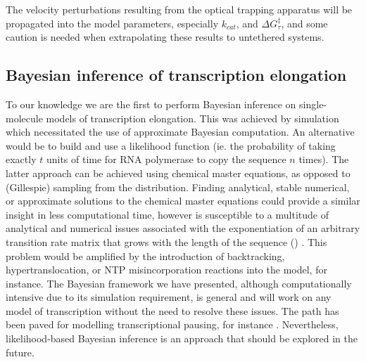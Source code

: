 \documentclass[10pt,letterpaper]{article}
\begin{document}
The velocity perturbations resulting from the optical trapping apparatus will be propagated into the model parameters, especially $k_{cat}$, and $\Delta G^\ddag_\tau$, and some caution is needed when extrapolating these results to untethered systems.   





\subsection*{Bayesian inference of transcription elongation} To our knowledge we are the first to perform Bayesian inference on single-molecule models of transcription elongation. This was achieved by simulation which necessitated the use of approximate Bayesian computation. An alternative would be to build and use a likelihood function (ie. the probability of taking exactly $t$ units of time for RNA polymerase to copy the sequence $n$ times). The latter approach can be achieved using chemical master equations, as opposed to (Gillespie) sampling from the distribution. Finding analytical, stable numerical, or approximate solutions to the chemical master equations could provide a similar insight in less computational time, however is susceptible to a multitude of analytical and numerical issues associated with the exponentiation of an arbitrary transition rate matrix that grows with the length of the sequence () \cite{moler2003nineteen}. This problem would be amplified by the introduction of backtracking, hypertranslocation, or NTP misincorporation reactions into the model, for instance. The Bayesian framework we have presented, although computationally intensive due to its simulation requirement, is general and will work on any model of transcription without the need to resolve these issues. The path has been paved for modelling transcriptional pausing, for instance \cite{bai2004sequence,tadigotla2006thermodynamic,bai2010comparison}. Nevertheless, likelihood-based Bayesian inference is an approach that should be explored in the future.


\end{document}
